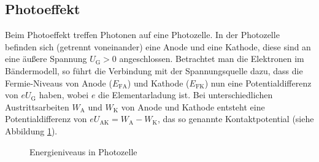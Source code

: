 \subsection{Photoeffekt}
Beim Photoeffekt treffen Photonen auf eine Photozelle. In der Photozelle befinden sich (getrennt voneinander) eine Anode und eine Kathode, diese sind an eine äußere Spannung $U_\mathrm{G}>0$ angeschlossen. Betrachtet man die Elektronen im Bändermodell, so führt die Verbindung mit der Spannungsquelle dazu, dass die Fermie-Niveaus von Anode ($E_\mathrm{FA}$) und Kathode ($E_\mathrm{FK}$) nun eine Potentialdifferenz von $e U_\mathrm{G}$ haben, wobei $e$ die Elementarladung ist. Bei unterschiedlichen Austrittsarbeiten $W_\mathrm{A}$ und $W_\mathrm{K}$ von Anode und Kathode entsteht eine Potentialdifferenz von $eU_\mathrm{AK}=W_\mathrm{A}-W_\mathrm{K}$, das so genannte Kontaktpotential (siehe Abbildung \ref{Photozelle}). 

\begin{figure}[h]
  \centering
  \caption{Energieniveaus in Photozelle}
  \label{Photozelle}
\end{figure}

